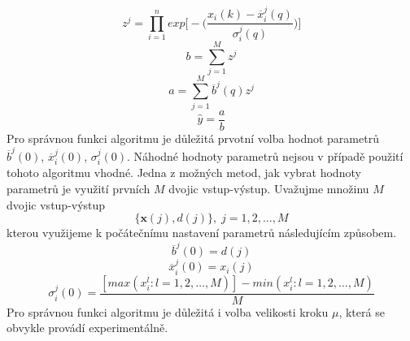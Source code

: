 \begin{equation}\label{eq:z}
    z^j=\prod_{i=1}^n exp \bigg[-\bigg(\frac{x_i(k)-\overline{x}_i^j(q)}{\sigma_i^j(q)}\bigg)\bigg]
\end{equation}
\begin{equation}\label{eq:b}
    b=\sum_{j=1}^M z^j
\end{equation}
\begin{equation}\label{eq:a}
    a=\sum_{j=1}^M \overline{b}^j(q) z^j
\end{equation}
\begin{equation}\label{eq:yhat}
    \hat{y}=\frac{a}{b}
\end{equation}
Pro správnou funkci algoritmu je důležitá prvotní volba hodnot parametrů $\overline{b}^j(0)$, $\overline{x}_i^j(0)$, $\sigma_i^j(0)$. Náhodné hodnoty parametrů nejsou v případě použití tohoto algoritmu vhodné. Jedna z možných metod, jak vybrat hodnoty parametrů je využití prvních $M$ dvojic vstup-výstup. Uvažujme množinu $M$ dvojic vstup-výstup
\begin{equation}
    \{\textbf{x}(j), d(j) \}, \; j=1,2,\dots,M
\end{equation}
kterou využijeme k počátečnímu nastavení parametrů následujícím způsobem.
\begin{equation}
    \overline{b}^j(0)=d(j)
\end{equation}
\begin{equation}
    \overline{x}_i^j(0)=x_i(j)
\end{equation}
\begin{equation}
    \sigma_i^j(0)=\frac{[max(x_i^l:l=1,2,\dots,M)]-min(x_i^l:l=1,2,\dots,M)}{M}
\end{equation}
Pro správnou funkci algoritmu je důležitá i volba velikosti kroku $\mu$, která se obvykle provádí experimentálně. 
